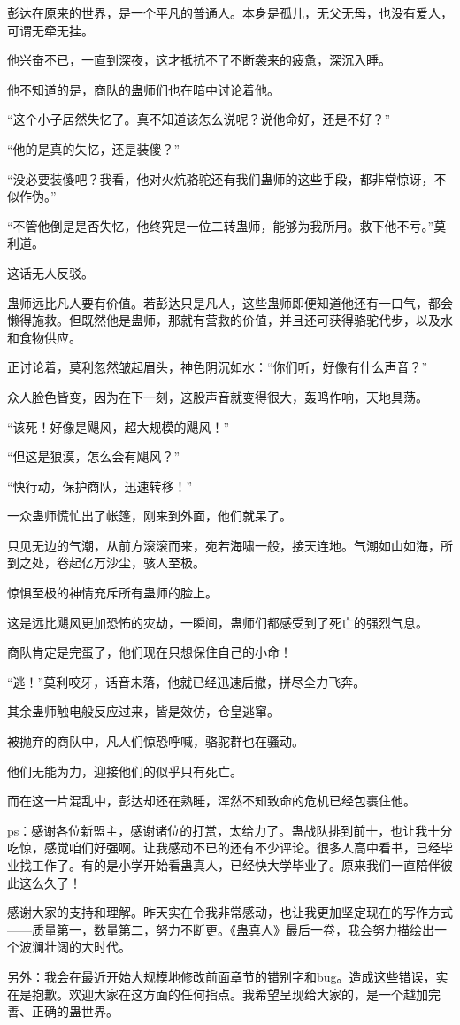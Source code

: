 \begin{this_body}
彭达在原来的世界，是一个平凡的普通人。本身是孤儿，无父无母，也没有爱人，可谓无牵无挂。

他兴奋不已，一直到深夜，这才抵抗不了不断袭来的疲惫，深沉入睡。

他不知道的是，商队的蛊师们也在暗中讨论着他。

“这个小子居然失忆了。真不知道该怎么说呢？说他命好，还是不好？”

“他的是真的失忆，还是装傻？”

“没必要装傻吧？我看，他对火炕骆驼还有我们蛊师的这些手段，都非常惊讶，不似作伪。”

“不管他倒是是否失忆，他终究是一位二转蛊师，能够为我所用。救下他不亏。”莫利道。

这话无人反驳。

蛊师远比凡人要有价值。若彭达只是凡人，这些蛊师即便知道他还有一口气，都会懒得施救。但既然他是蛊师，那就有营救的价值，并且还可获得骆驼代步，以及水和食物供应。

正讨论着，莫利忽然皱起眉头，神色阴沉如水：“你们听，好像有什么声音？”

众人脸色皆变，因为在下一刻，这股声音就变得很大，轰鸣作响，天地具荡。

“该死！好像是飓风，超大规模的飓风！”

“但这是狼漠，怎么会有飓风？”

“快行动，保护商队，迅速转移！”

一众蛊师慌忙出了帐篷，刚来到外面，他们就呆了。

只见无边的气潮，从前方滚滚而来，宛若海啸一般，接天连地。气潮如山如海，所到之处，卷起亿万沙尘，骇人至极。

惊惧至极的神情充斥所有蛊师的脸上。

这是远比飓风更加恐怖的灾劫，一瞬间，蛊师们都感受到了死亡的强烈气息。

商队肯定是完蛋了，他们现在只想保住自己的小命！

“逃！”莫利咬牙，话音未落，他就已经迅速后撤，拼尽全力飞奔。

其余蛊师触电般反应过来，皆是效仿，仓皇逃窜。

被抛弃的商队中，凡人们惊恐呼喊，骆驼群也在骚动。

他们无能为力，迎接他们的似乎只有死亡。

而在这一片混乱中，彭达却还在熟睡，浑然不知致命的危机已经包裹住他。

ps：感谢各位新盟主，感谢诸位的打赏，太给力了。蛊战队排到前十，也让我十分吃惊，感觉咱们好强啊。让我感动不已的还有不少评论。很多人高中看书，已经毕业找工作了。有的是小学开始看蛊真人，已经快大学毕业了。原来我们一直陪伴彼此这么久了！

感谢大家的支持和理解。昨天实在令我非常感动，也让我更加坚定现在的写作方式——质量第一，数量第二，努力不断更。《蛊真人》最后一卷，我会努力描绘出一个波澜壮阔的大时代。

另外：我会在最近开始大规模地修改前面章节的错别字和bug。造成这些错误，实在是抱歉。欢迎大家在这方面的任何指点。我希望呈现给大家的，是一个越加完善、正确的蛊世界。

\end{this_body}

